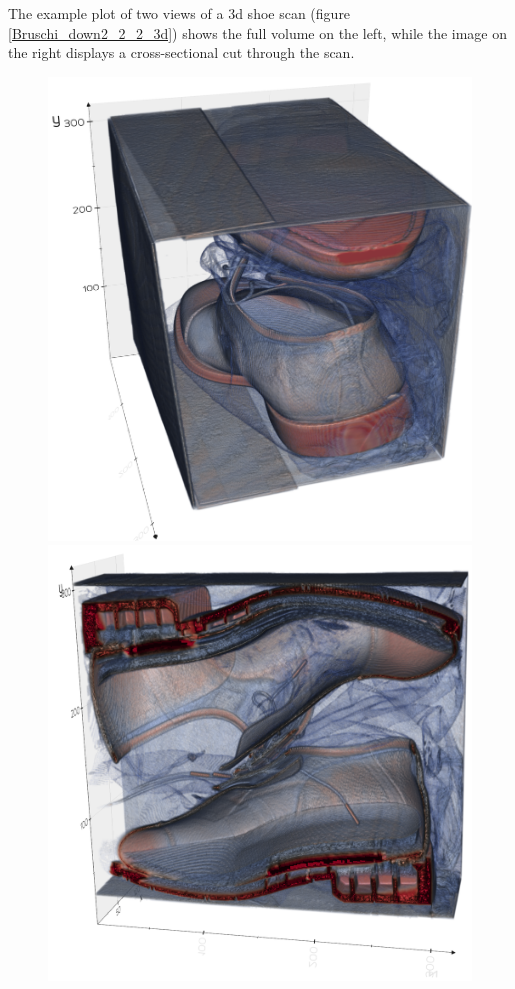 \medskip

The example plot of two views of a \gls{3d} shoe scan (figure \ref{Bruschi_down2_2_2_3d}) shows the full volume on the left, while the image on the right displays a cross-sectional cut through the scan. 

\begin{figure}[H]
	\centering
	\begin{minipage}{.5\textwidth}
		\centering
		\includegraphics[width=1.0\textwidth]{./images/Bruschi_down2_2_2_3d.png}
	\end{minipage}%
	\begin{minipage}{.5\textwidth}
		\centering
		\centering
		\includegraphics[width=1.0\textwidth]{./images/Bruschi_down2_2_2_3d_half.png}

\end{minipage}
\end{figure}
